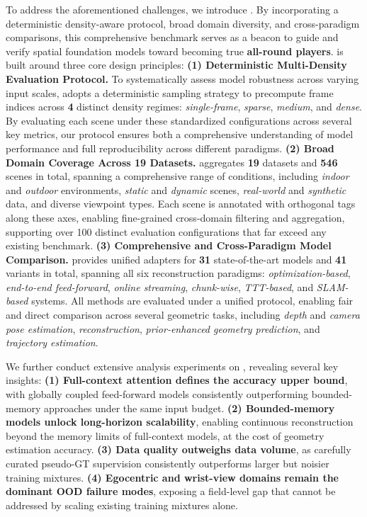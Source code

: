 To address the aforementioned challenges, we introduce \textbf{\benchmark}. 
%
By incorporating a deterministic density-aware protocol, broad domain diversity, and cross-paradigm comparisons, this comprehensive benchmark serves as a beacon to guide and verify spatial foundation models toward becoming true \textbf{all-round players}.
%
\benchmark is built around three core design principles:
%
\noindent\textbf{(1) Deterministic Multi-Density Evaluation Protocol.}
To systematically assess model robustness across varying input scales, \benchmark adopts a deterministic sampling strategy to precompute frame indices across \textbf{4} distinct density regimes: \textit{single-frame}, \textit{sparse}, \textit{medium}, and \textit{dense}. 
%
By evaluating each scene under these standardized configurations across several key metrics, our protocol ensures both a comprehensive understanding of model performance and full reproducibility across different paradigms.
%
\noindent\textbf{(2) Broad Domain Coverage Across 19 Datasets.}
%
\benchmark aggregates \textbf{19} datasets and \textbf{546} scenes in total, spanning a comprehensive range of conditions, including \textit{indoor} and \textit{outdoor} environments, \textit{static} and \textit{dynamic} scenes, \textit{real-world} and \textit{synthetic} data, and diverse viewpoint types.
%
Each scene is annotated with orthogonal tags along these axes, enabling fine-grained cross-domain filtering and aggregation, supporting over 100 distinct evaluation configurations that far exceed any existing benchmark.
%
\noindent\textbf{(3) Comprehensive and Cross-Paradigm Model Comparison.}
%
\benchmark provides unified adapters for \textbf{31} state-of-the-art models and \textbf{41} variants in total, spanning all six reconstruction paradigms: \textit{optimization-based}, \textit{end-to-end feed-forward}, \textit{online streaming}, \textit{chunk-wise}, \textit{TTT-based}, and \textit{SLAM-based} systems.
%
All methods are evaluated under a unified protocol, enabling fair and direct comparison across several geometric tasks, including \textit{depth} and \textit{camera pose estimation}, \textit{reconstruction}, \textit{prior-enhanced geometry prediction}, and \textit{trajectory estimation}.

We further conduct extensive analysis experiments on \benchmark, revealing several key insights:
\textbf{(1) Full-context attention defines the accuracy upper bound}, with globally coupled feed-forward models consistently outperforming bounded-memory approaches under the same input budget.
%
\textbf{(2) Bounded-memory models unlock long-horizon scalability}, enabling continuous reconstruction beyond the memory limits of full-context models, at the cost of geometry estimation accuracy.
%
\textbf{(3) Data quality outweighs data volume}, as carefully curated pseudo-GT supervision consistently outperforms larger but noisier training mixtures.
%
\textbf{(4) Egocentric and wrist-view domains remain the dominant OOD failure modes}, exposing a field-level gap that cannot be addressed by scaling existing training mixtures alone.



